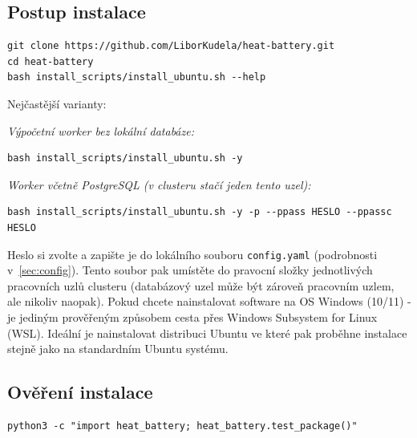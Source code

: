 \documentclass[a4paper,11pt]{article}
\begin{document}
\subsection*{Postup instalace}

\begin{lstlisting}[style=bash]
git clone https://github.com/LiborKudela/heat-battery.git
cd heat-battery
bash install_scripts/install_ubuntu.sh --help
\end{lstlisting}

Nejčastější varianty:

%
\begin{minipage}{\linewidth}
{\small\emph{Výpočetní worker bez lokální databáze:}}%
\nopagebreak

\begin{lstlisting}[style=bash]
bash install_scripts/install_ubuntu.sh -y
\end{lstlisting}
\end{minipage}

\medskip
{}%
\begin{minipage}{\linewidth}
{\small\emph{Worker včetně PostgreSQL (v clusteru stačí jeden tento uzel):}}%
\nopagebreak

\begin{lstlisting}[style=bash]
bash install_scripts/install_ubuntu.sh -y -p --ppass HESLO --ppassc HESLO
\end{lstlisting}
\end{minipage}

Heslo si zvolte a zapište je do lokálního souboru \texttt{config.yaml}
(podrobnosti v~\autoref{sec:config}). Tento soubor pak umístěte do pravocní
složky jednotlivých pracovních uzlů clusteru (databázový uzel může být zároveň
pracovním uzlem, ale nikoliv naopak). Pokud chcete nainstalovat software na OS 
Windows (10/11)  - je jediným prověřeným způsobem cesta přes Windows Subsystem
for Linux (WSL). Ideální je nainstalovat distribuci Ubuntu ve které pak proběhne
instalace stejně jako na standardním Ubuntu systému.

\subsection*{Ověření instalace}

\begin{lstlisting}[style=bash]
python3 -c "import heat_battery; heat_battery.test_package()"
\end{lstlisting}
\end{document}
